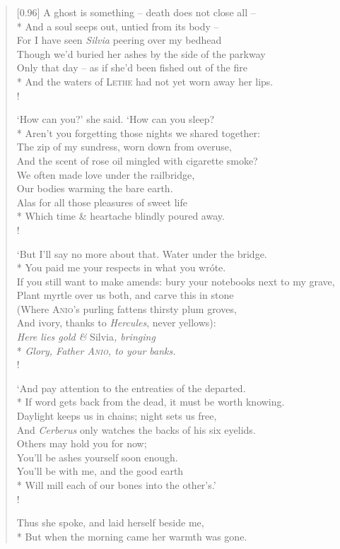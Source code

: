 \begin{verse}[0.96\textwidth]
A ghost is something -- death does not close all --\\*
\vin And a soul seeps out, untied from its body --\\
For I have seen \textit{Silvia} peering over my bedhead\\
\vin Though we'd buried her ashes by the side of the parkway\\
Only that day -- as if she'd been fished out of the fire\\*
\vin And the waters of \textsc{Lethe} had not yet worn away her lips.\\!

`How can you?' she said. `How can you sleep?\\*
\vin Aren't you forgetting those nights we shared together:\nobreak\\
The zip of my sundress, worn down from overuse,\\
\vin And the scent of rose oil mingled with cigarette smoke?\\
We often made love under the railbridge,\\
\vin Our bodies warming the bare earth.\\
Alas for all those pleasures of sweet life\\*
\vin Which time \& heartache blindly poured away.\\!

`But I'll say no more about that. Water under the bridge.\nobreak\\*
\vin You paid me your respects in what you wr\'ote.\\
If you still want to make amends: bury your notebooks next to my grave,\\
\vin Plant myrtle over us both, and carve this in stone\\
(Where \textsc{Anio}'s purling fattens thirsty plum groves,\\
\vin And ivory, thanks to \textit{Hercules}, never yellows):\\
\textit{Here lies gold \& }Silvia\textit{, bringing}\\*
\vin \textit{Glory, Father \textsc{Anio}, to your banks.}\\!

`And pay attention to the entreaties of the departed.\\*
\vin If word gets back from the dead, it must be worth knowing.\\
Daylight keeps us in chains; night sets us free,\\
\vin And \textit{Cerberus} only watches the backs of his six eyelids.\nobreak\\
Others may hold you for now;\\
\vin You'll be ashes yourself soon enough.\\
You'll be with me, and the good earth\\*
\vin Will mill each of our bones into the other's.'\\!

Thus she spoke, and laid herself beside me,\\*
\vin But when the morning came her warmth was gone.
\end{verse}
